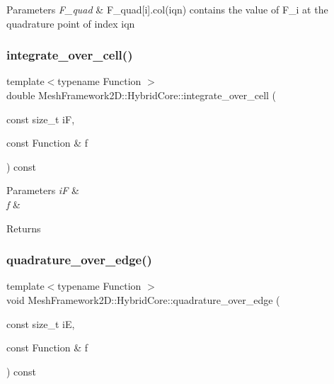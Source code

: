 \begin{DoxyParams}{Parameters}
{\em F\+\_\+quad} & F\+\_\+quad\mbox{[}i\mbox{]}.col(iqn) contains the value of F\+\_\+i at the quadrature point of index iqn \\
\hline
\end{DoxyParams}
\mbox{\label{classMeshFramework2D_1_1HybridCore_a7b4f67367d7b3fd016369aebd006b8aa}} 
\subsubsection{\texorpdfstring{integrate\+\_\+over\+\_\+cell()}{integrate\_over\_cell()}}
{\footnotesize\ttfamily template$<$typename Function $>$ \\
double Mesh\+Framework2\+D\+::\+Hybrid\+Core\+::integrate\+\_\+over\+\_\+cell (\begin{DoxyParamCaption}\item[{const size\+\_\+t}]{iF,  }\item[{const Function \&}]{f }\end{DoxyParamCaption}) const}


\begin{DoxyParams}{Parameters}
{\em iF} & \\
\hline
{\em f} & \\
\hline
\end{DoxyParams}
\begin{DoxyReturn}{Returns}

\end{DoxyReturn}
\mbox{\label{classMeshFramework2D_1_1HybridCore_a4354cc25879093b3a1dcd0efe7e2e07a}} 
\subsubsection{\texorpdfstring{quadrature\+\_\+over\+\_\+edge()}{quadrature\_over\_edge()}\hspace{0.1cm}{\footnotesize\ttfamily [1/2]}}
{\footnotesize\ttfamily template$<$typename Function $>$ \\
void Mesh\+Framework2\+D\+::\+Hybrid\+Core\+::quadrature\+\_\+over\+\_\+edge (\begin{DoxyParamCaption}\item[{const size\+\_\+t}]{iE,  }\item[{const Function \&}]{f }\end{DoxyParamCaption}) const}


